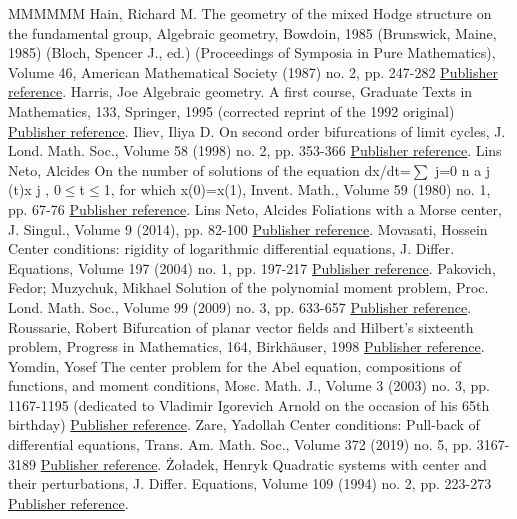 \documentclass[11pt]{article}
\theoremstyle{definition}
\numberwithin{equation}{section}
\numberwithin{figure}{section}
\numberwithin{table}{section}
\begin{document}
\begin{thebibliography}{MMMMMM}
 Hain, Richard M. The geometry of the mixed Hodge structure on the fundamental group, Algebraic geometry, Bowdoin, 1985 (Brunswick, Maine, 1985) (Bloch, Spencer J., ed.) (Proceedings of Symposia in Pure Mathematics), Volume 46, American Mathematical Society (1987) no. 2, pp. 247-282 \href{https://ahl.centre-mersenne.org/item/AHL_2020__3__615_0/#hain87}{Publisher reference}.
 Harris, Joe Algebraic geometry. A first course, Graduate Texts in Mathematics, 133, Springer, 1995 (corrected reprint of the 1992 original) \href{https://ahl.centre-mersenne.org/item/AHL_2020__3__615_0/#harr95}{Publisher reference}.
 Iliev, Iliya D. On second order bifurcations of limit cycles, J. Lond. Math. Soc., Volume 58 (1998) no. 2, pp. 353-366 \href{https://ahl.centre-mersenne.org/item/AHL_2020__3__615_0/#ilie98a}{Publisher reference}.
 Lins Neto, Alcides On the number of solutions of the equation dx/dt=\(\sum\) j=0 n a j (t)x j , 0\(\leq\)t\(\leq\)1, for which x(0)=x(1), Invent. Math., Volume 59 (1980) no. 1, pp. 67-76 \href{https://ahl.centre-mersenne.org/item/AHL_2020__3__615_0/#lins80}{Publisher reference}.
 Lins Neto, Alcides Foliations with a Morse center, J. Singul., Volume 9 (2014), pp. 82-100 \href{https://ahl.centre-mersenne.org/item/AHL_2020__3__615_0/#lins14}{Publisher reference}.
 Movasati, Hossein Center conditions: rigidity of logarithmic differential equations, J. Differ. Equations, Volume 197 (2004) no. 1, pp. 197-217 \href{https://ahl.centre-mersenne.org/item/AHL_2020__3__615_0/#mova04}{Publisher reference}.
 Pakovich, Fedor; Muzychuk, Mikhael Solution of the polynomial moment problem, Proc. Lond. Math. Soc., Volume 99 (2009) no. 3, pp. 633-657 \href{https://ahl.centre-mersenne.org/item/AHL_2020__3__615_0/#pamu09}{Publisher reference}.
 Roussarie, Robert Bifurcation of planar vector fields and Hilbert’s sixteenth problem, Progress in Mathematics, 164, Birkhäuser, 1998 \href{https://ahl.centre-mersenne.org/item/AHL_2020__3__615_0/#rous98}{Publisher reference}.
 Yomdin, Yosef The center problem for the Abel equation, compositions of functions, and moment conditions, Mosc. Math. J., Volume 3 (2003) no. 3, pp. 1167-1195 (dedicated to Vladimir Igorevich Arnold on the occasion of his 65th birthday) \href{https://ahl.centre-mersenne.org/item/AHL_2020__3__615_0/#yomd03}{Publisher reference}.
 Zare, Yadollah Center conditions: Pull-back of differential equations, Trans. Am. Math. Soc., Volume 372 (2019) no. 5, pp. 3167-3189 \href{https://ahl.centre-mersenne.org/item/AHL_2020__3__615_0/#zare19}{Publisher reference}.
 Żoładek, Henryk Quadratic systems with center and their perturbations, J. Differ. Equations, Volume 109 (1994) no. 2, pp. 223-273 \href{https://ahl.centre-mersenne.org/item/AHL_2020__3__615_0/#zola94}{Publisher reference}.
\end{thebibliography}
\end{document}
